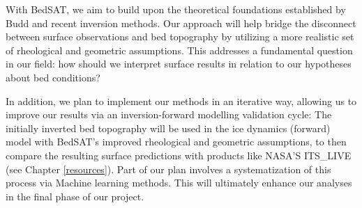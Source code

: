 With BedSAT, we aim to build upon the theoretical foundations established by Budd and recent inversion methods. Our approach will help bridge the disconnect between surface observations and bed topography by utilizing a more realistic set of rheological and geometric assumptions.  This addresses a fundamental question in our field: how should we interpret surface results in relation to our hypotheses about bed conditions? 

In addition, we plan to implement our methods in an iterative way, allowing us to improve our results via an inversion-forward modelling validation cycle: The initially inverted bed topography will be used in the ice dynamics (forward) model with BedSAT's improved rheological and geometric assumptions, to then compare the resulting surface predictions with products like NASA'S ITS\_LIVE (see Chapter \ref{resources}). Part of our plan involves a systematization of this process via Machine learning methods. This will ultimately enhance our analyses in the final phase of our project.
